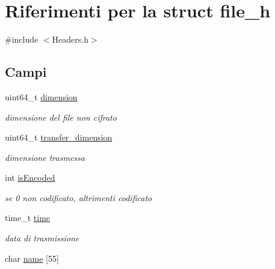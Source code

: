 \hypertarget{structfile__h}{}\section{Riferimenti per la struct file\+\_\+h}
\label{structfile__h}


{\ttfamily \#include $<$Headers.\+h$>$}

\subsection*{Campi}
\begin{DoxyCompactItemize}
\item 
uint64\+\_\+t \hyperlink{structfile__h_aa060043d353f2e6ad89056b41d447db1}{dimension}\hypertarget{structfile__h_aa060043d353f2e6ad89056b41d447db1}{}\label{structfile__h_aa060043d353f2e6ad89056b41d447db1}

\begin{DoxyCompactList}\small\item\em dimensione del file non cifrato \end{DoxyCompactList}\item 
uint64\+\_\+t \hyperlink{structfile__h_ab38d74a27790a6f78dbdafa8abb22b53}{transfer\+\_\+dimension}\hypertarget{structfile__h_ab38d74a27790a6f78dbdafa8abb22b53}{}\label{structfile__h_ab38d74a27790a6f78dbdafa8abb22b53}

\begin{DoxyCompactList}\small\item\em dimensione trasmessa \end{DoxyCompactList}\item 
int \hyperlink{structfile__h_aa1bed54bf0f50c6cedab5592b87fe23c}{is\+Encoded}\hypertarget{structfile__h_aa1bed54bf0f50c6cedab5592b87fe23c}{}\label{structfile__h_aa1bed54bf0f50c6cedab5592b87fe23c}

\begin{DoxyCompactList}\small\item\em se 0 non codificato, altrimenti codificato \end{DoxyCompactList}\item 
time\+\_\+t \hyperlink{structfile__h_a2597abbe20de9abafd0b19f894bc4995}{time}\hypertarget{structfile__h_a2597abbe20de9abafd0b19f894bc4995}{}\label{structfile__h_a2597abbe20de9abafd0b19f894bc4995}

\begin{DoxyCompactList}\small\item\em data di trasmissione \end{DoxyCompactList}\item 
char \hyperlink{structfile__h_adb638eabdc439fe6ad101f8a482de3bd}{name} \mbox{[}55\mbox{]}\hypertarget{structfile__h_adb638eabdc439fe6ad101f8a482de3bd}{}\label{structfile__h_adb638eabdc439fe6ad101f8a482de3bd}


\end{DoxyCompactItemize}
